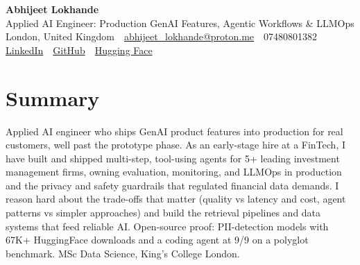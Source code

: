 \documentclass[10pt,a4paper]{article}
\newcommand{\sep}{\,\textcolor{accent!60}{\textbar}\,}
\begin{document}
\begin{center}
  {\fontsize{24}{26}\selectfont\bfseries Abhijeet Lokhande}\\[3pt]
  {\color{accent}\large Applied AI Engineer: Production GenAI Features, Agentic Workflows \& LLMOps}\\[5pt]
  {\small
    London, United Kingdom \sep
    \href{mailto:abhijeet_lokhande@proton.me}{abhijeet\_lokhande@proton.me} \sep
    07480801382 \\[2pt]
    \href{https://www.linkedin.com/in/ablds/}{LinkedIn} \sep
    \href{https://github.com/abhijeetscode}{GitHub} \sep
    \href{https://huggingface.co/ab-ai}{Hugging Face}
  }
\end{center}
\vspace{2pt}

\section{Summary}
Applied AI engineer who ships GenAI product features into production for real customers, well past the prototype phase. As an early-stage hire at a FinTech, I have built and shipped multi-step, tool-using agents for 5+ leading investment management firms, owning evaluation, monitoring, and LLMOps in production and the privacy and safety guardrails that regulated financial data demands. I reason hard about the trade-offs that matter (quality vs latency and cost, agent patterns vs simpler approaches) and build the retrieval pipelines and data systems that feed reliable AI. Open-source proof: PII-detection models with 67K+ HuggingFace downloads and a coding agent at 9/9 on a polyglot benchmark. MSc Data Science, King's College London.

\end{document}
